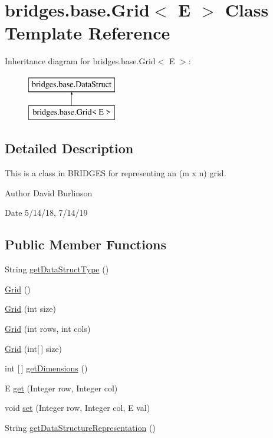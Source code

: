 \hypertarget{classbridges_1_1base_1_1_grid}{}\section{bridges.\+base.\+Grid$<$ E $>$ Class Template Reference}
\label{classbridges_1_1base_1_1_grid}
Inheritance diagram for bridges.\+base.\+Grid$<$ E $>$\+:\begin{figure}[H]
\begin{center}
\leavevmode
\includegraphics[height=2.000000cm]{classbridges_1_1base_1_1_grid}
\end{center}
\end{figure}


\subsection{Detailed Description}
This is a class in B\+R\+I\+D\+G\+ES for representing an (m x n) grid. 

\begin{DoxyAuthor}{Author}
David Burlinson 
\end{DoxyAuthor}
\begin{DoxyDate}{Date}
5/14/18, 7/14/19 
\end{DoxyDate}
\subsection*{Public Member Functions}
\begin{DoxyCompactItemize}
\item 
String \hyperlink{classbridges_1_1base_1_1_grid_a81f268dd27c292ff2af9358039d4ebe6}{get\+Data\+Struct\+Type} ()
\item 
\hyperlink{classbridges_1_1base_1_1_grid_aa621ffc958db8341f7ce37ed78944d51}{Grid} ()
\item 
\hyperlink{classbridges_1_1base_1_1_grid_a9818d4959813f1292c6a234bc6f6aa9e}{Grid} (int size)
\item 
\hyperlink{classbridges_1_1base_1_1_grid_a43a699bd7ae2c6c986f978c515ff97d8}{Grid} (int rows, int cols)
\item 
\hyperlink{classbridges_1_1base_1_1_grid_ab9975b28d8dda7f3fbe0e35a7a026772}{Grid} (int\mbox{[}$\,$\mbox{]} size)
\item 
int \mbox{[}$\,$\mbox{]} \hyperlink{classbridges_1_1base_1_1_grid_aee8a5b66095d65ff067a4e76f2611b0e}{get\+Dimensions} ()
\item 
E \hyperlink{classbridges_1_1base_1_1_grid_a698579bb5b7166f76a18a1b04916e090}{get} (Integer row, Integer col)
\item 
void \hyperlink{classbridges_1_1base_1_1_grid_ab79ceb737423bb28ea2348e61a625a17}{set} (Integer row, Integer col, E val)
\item 
String \hyperlink{classbridges_1_1base_1_1_grid_a9a7faf2bbabae8d2f2babe9e29deb2c8}{get\+Data\+Structure\+Representation} ()
\end{DoxyCompactItemize}
